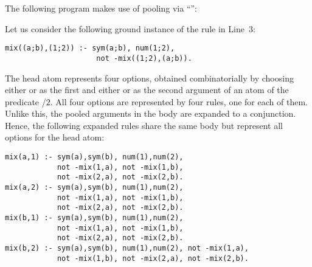 \begin{example}\label{ex:pool}
The following program makes use of pooling via ``\code{;}'':
%

%
Let us consider the following ground instance of the rule in Line~3:
\begin{lstlisting}[numbers=none]
 mix((a;b),(1;2)) :- sym(a;b), num(1;2),
                     not -mix((1;2),(a;b)).
\end{lstlisting}
The head atom  
represents four options, obtained combinatorially
by choosing either  or  as the first
and either  or  as the second argument
of an atom of the predicate /$2$.
All four options are represented by four rules,
one for each of them.
Unlike this,
the pooled arguments in the body are expanded to a conjunction.
Hence, the following expanded rules share the same body but represent
all options for the head atom:%
%
%
\begin{lstlisting}[numbers=none]
mix(a,1) :- sym(a),sym(b), num(1),num(2), 
            not -mix(1,a), not -mix(1,b), 
            not -mix(2,a), not -mix(2,b).
mix(a,2) :- sym(a),sym(b), num(1),num(2), 
            not -mix(1,a), not -mix(1,b), 
            not -mix(2,a), not -mix(2,b).
mix(b,1) :- sym(a),sym(b), num(1),num(2), 
            not -mix(1,a), not -mix(1,b), 
            not -mix(2,a), not -mix(2,b).
mix(b,2) :- sym(a),sym(b), num(1),num(2), not -mix(1,a),
            not -mix(1,b), not -mix(2,a), not -mix(2,b).
\end{lstlisting}
\eexample
\end{example}

